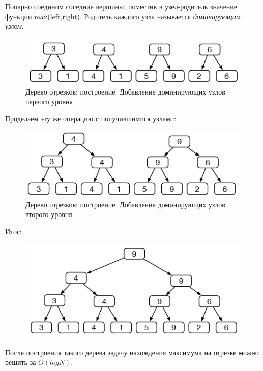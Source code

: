 \documentclass{beamer}
\begin{document}
\begin{frame}
	Попарно соединим соседние вершины, поместив в узел-родитель значение функции max(left,right). Родитель каждого узла называется \textit{доминирующим узлом}.
	\begin{figure}[h]
		\centering
		\includegraphics[scale=0.5]{images/lec07-pic18.png}
		\caption{Дерево отрезков: построение. Добавление доминирующих узлов первого уровня}
	\end{figure}
	Проделаем эту же операцию с получившимися узлами:
	\begin{figure}[h]
		\centering
		\includegraphics[scale=0.5]{images/lec07-pic19.png}
		\caption{Дерево отрезков: построение. Добавление доминирующих узлов второго уровня}
	\end{figure}	
\end{frame}	

\begin{frame}
	Итог:
	\begin{figure}[h]
		\centering
		\includegraphics[scale=0.5]{images/lec07-pic20.png}
	\end{figure}
	После построения такого дерева задачу нахождения максимума на отрезке можно решить за $O(log N)$.
\end{frame}	
\end{document}
